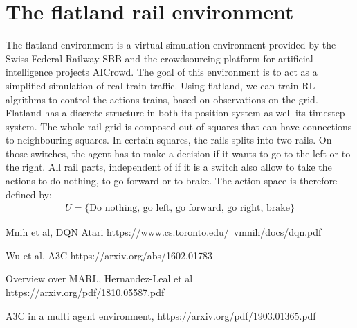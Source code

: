 \section{The flatland rail environment}\label{projektmanagement}
The flatland environment is a virtual simulation environment provided by the Swiss Federal Railway SBB and the crowdsourcing platform for artificial intelligence projects AICrowd.
The goal of this environment is to act as a simplified simulation of real train traffic. Using flatland, we can train RL algrithms to control the actions trains, based on observations on the grid. Flatland has a discrete structure in both its position system as well its timestep system. The whole rail grid is composed out of squares that can have connections to neighbouring squares. In certain squares, the rails splits into two rails. On those switches, the agent has to make a decision if it wants to go to the left or to the right. All rail parts, independent of if it is a switch also allow to take the actions to do nothing, to go forward or to brake. The action space is therefore defined by:
\begin{gather*}
U = \{ \text{Do nothing, go left, go forward, go right, brake} \}
\end{gather*}





Mnih et al, DQN Atari
https://www.cs.toronto.edu/~vmnih/docs/dqn.pdf

Wu et al, A3C
https://arxiv.org/abs/1602.01783

Overview over MARL, Hernandez-Leal et al
https://arxiv.org/pdf/1810.05587.pdf

A3C in a multi agent environment, 
https://arxiv.org/pdf/1903.01365.pdf

